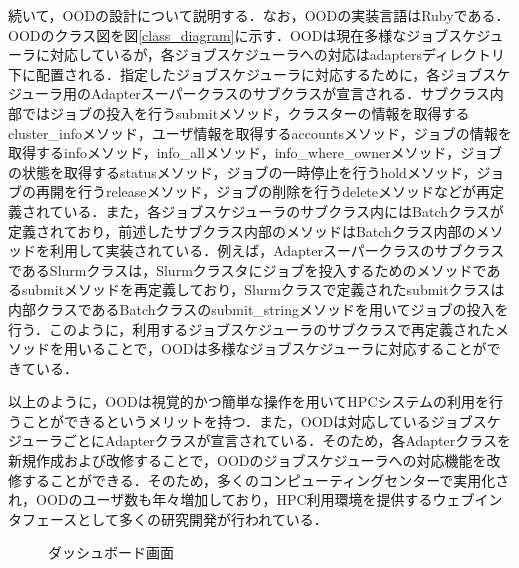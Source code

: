 続いて，OODの設計について説明する．なお，OODの実装言語はRubyである．OODのクラス図を図\ref{class_diagram}に示す．OODは現在多様なジョブスケジューラに対応しているが，各ジョブスケジューラへの対応はadaptersディレクトリ下に配置される．指定したジョブスケジューラに対応するために，各ジョブスケジューラ用のAdapterスーパークラスのサブクラスが宣言される．サブクラス内部ではジョブの投入を行うsubmitメソッド，クラスターの情報を取得するcluster\_infoメソッド，ユーザ情報を取得するaccountsメソッド，ジョブの情報を取得するinfoメソッド，info\_allメソッド，info\_where\_ownerメソッド，ジョブの状態を取得するstatusメソッド，ジョブの一時停止を行うholdメソッド，ジョブの再開を行うreleaseメソッド，ジョブの削除を行うdeleteメソッドなどが再定義されている．また，各ジョブスケジューラのサブクラス内にはBatchクラスが定義されており，前述したサブクラス内部のメソッドはBatchクラス内部のメソッドを利用して実装されている．例えば，AdapterスーパークラスのサブクラスであるSlurmクラスは，Slurmクラスタにジョブを投入するためのメソッドであるsubmitメソッドを再定義しており，Slurmクラスで定義されたsubmitクラスは内部クラスであるBatchクラスのsubmit\_stringメソッドを用いてジョブの投入を行う．このように，利用するジョブスケジューラのサブクラスで再定義されたメソッドを用いることで，OODは多様なジョブスケジューラに対応することができている．\par
以上のように，OODは視覚的かつ簡単な操作を用いてHPCシステムの利用を行うことができるというメリットを持つ．また，OODは対応しているジョブスケジューラごとにAdapterクラスが宣言されている．そのため，各Adapterクラスを新規作成および改修することで，OODのジョブスケジューラへの対応機能を改修することができる．そのため，多くのコンピューティングセンターで実用化され，OODのユーザ数も年々増加しており，HPC利用環境を提供するウェブインタフェースとして多くの研究開発が行われている．\par

\begin{figure}[t]
    \centering
    \caption{ダッシュボード画面}
    \label{dashboard}
\end{figure}

